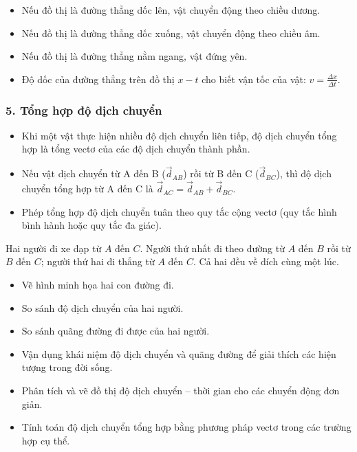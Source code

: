 \begin{kienthuc}
\begin{itemize}
    \item Nếu đồ thị là đường thẳng dốc lên, vật chuyển động theo chiều dương.
    \item Nếu đồ thị là đường thẳng dốc xuống, vật chuyển động theo chiều âm.
    \item Nếu đồ thị là đường thẳng nằm ngang, vật đứng yên.
    \item Độ dốc của đường thẳng trên đồ thị $x-t$ cho biết vận tốc của vật: $v = \frac{\Delta x}{\Delta t}$.
\end{itemize}
\end{kienthuc}

\subsubsection{5. Tổng hợp độ dịch chuyển}

\begin{kienthuc}
\begin{itemize}
    \item Khi một vật thực hiện nhiều độ dịch chuyển liên tiếp, độ dịch chuyển tổng hợp là tổng vectơ của các độ dịch chuyển thành phần.
    \item Nếu vật dịch chuyển từ A đến B ($\vec{d}_{AB}$) rồi từ B đến C ($\vec{d}_{BC}$), thì độ dịch chuyển tổng hợp từ A đến C là $\vec{d}_{AC} = \vec{d}_{AB} + \vec{d}_{BC}$.
    \item Phép tổng hợp độ dịch chuyển tuân theo quy tắc cộng vectơ (quy tắc hình bình hành hoặc quy tắc đa giác).
\end{itemize}
\end{kienthuc}

\begin{hoatdong}
Hai người đi xe đạp từ $A$ đến $C$. Người thứ nhất đi theo đường từ $A$ đến $B$ rồi từ $B$ đến $C$; người thứ hai đi thẳng từ $A$ đến $C$. Cả hai đều về đích cùng một lúc.
\begin{itemize}
    \item Vẽ hình minh họa hai con đường đi.
    \item So sánh độ dịch chuyển của hai người.
    \item So sánh quãng đường đi được của hai người.
\end{itemize}
\end{hoatdong}

\begin{emcothe}
\begin{itemize}
    \item Vận dụng khái niệm độ dịch chuyển và quãng đường để giải thích các hiện tượng trong đời sống.
    \item Phân tích và vẽ đồ thị độ dịch chuyển -- thời gian cho các chuyển động đơn giản.
    \item Tính toán độ dịch chuyển tổng hợp bằng phương pháp vectơ trong các trường hợp cụ thể.
\end{itemize}
\end{emcothe}
